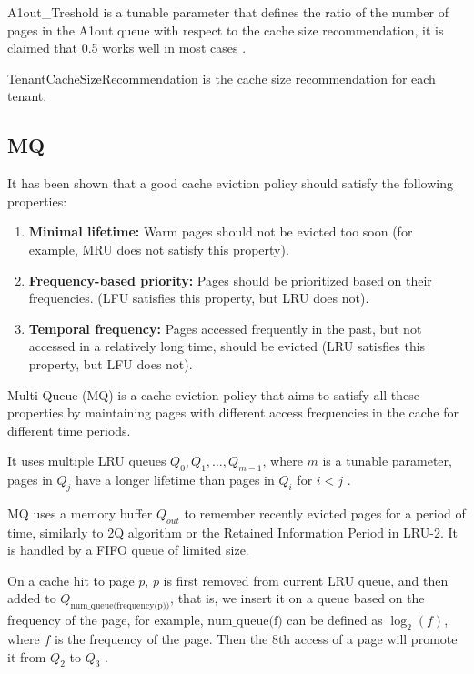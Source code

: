 A1out\_Treshold is a tunable parameter that defines the ratio of the number of pages in the A1out
queue with respect to the cache size recommendation, it is claimed that 0.5 works well in most
cases \cite{2q-article}.

TenantCacheSizeRecommendation is the cache size recommendation for each tenant.

\subsection{MQ}

It has been shown that a good cache eviction policy should satisfy the following properties:

\begin{enumerate}
    \item \textbf{Minimal lifetime:} Warm pages should not be evicted too soon (for 
    example, MRU does not satisfy this property).
    \item \textbf{Frequency-based priority:} Pages should be prioritized based on their 
    frequencies. (LFU satisfies this property, but LRU does not).
    \item \textbf{Temporal frequency:} Pages accessed frequently in the past, but not 
    accessed in a relatively long time, should be evicted (LRU satisfies this property, 
    but LFU does not).
\end{enumerate}

Multi-Queue (MQ) is a cache eviction policy that aims to satisfy all these properties \cite{mq-article}
by maintaining pages with different access frequencies in the cache for different time periods.

It uses multiple LRU queues $Q_0, Q_1, \ldots, Q_{m-1}$, where $m$ is a tunable parameter, pages in $Q_j$
have a longer lifetime than pages in $Q_{i}$ for $i < j$ \cite{mq-article}.

MQ uses a memory buffer $Q_{out}$ to remember recently evicted pages for a period of time, similarly to
2Q algorithm \cite{2q-article} or the Retained Information Period in LRU-2. It is handled by a 
FIFO queue of limited size.

On a cache hit to page $p$, $p$ is first removed from current LRU queue, and then added to 
$Q_{\text{num\_queue(frequency(p))}}$, that is, we insert it on a queue based on the frequency of the page,
for example, $\text{num\_queue(f)}$ can be defined as $\log_2(f)$, where $f$ is the frequency of the page.
Then the $8$th access of a page will promote it from $Q_2$ to $Q_3$ \cite{mq-article}.

